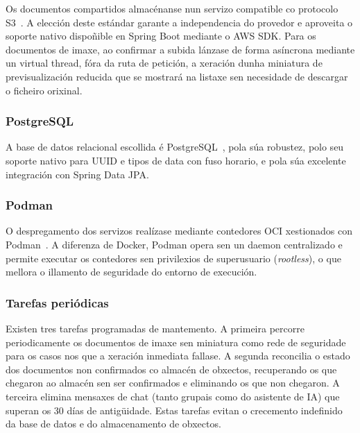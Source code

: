 Os documentos compartidos almacénanse nun servizo compatible co protocolo S3~\cite{minio}. A
elección deste estándar garante a independencia do provedor e aproveita o soporte
nativo dispoñible en Spring Boot mediante o AWS SDK. Para os documentos de imaxe,
ao confirmar a subida lánzase de forma asíncrona mediante un virtual thread,
fóra da ruta de petición, a xeración dunha miniatura de previsualización reducida
que se mostrará na listaxe sen necesidade de descargar o ficheiro orixinal.

\subsubsection*{PostgreSQL}

A base de datos relacional escollida é PostgreSQL~\cite{postgresql}, pola súa robustez, polo seu soporte
nativo para UUID e tipos de data con fuso horario, e pola súa excelente integración
con Spring Data JPA.

\subsubsection*{Podman}

O despregamento dos servizos realízase mediante contedores OCI xestionados con Podman~\cite{podman}.
A diferenza de Docker, Podman opera sen un daemon centralizado e permite executar os
contedores sen privilexios de superusuario (\textit{rootless}), o que mellora o
illamento de seguridade do entorno de execución.

\subsubsection*{Tarefas periódicas}

Existen tres tarefas programadas de mantemento. A primeira percorre periodicamente os
documentos de imaxe sen miniatura como rede de seguridade para os casos nos que a
xeración inmediata fallase. A segunda reconcilia o estado dos documentos non confirmados
co almacén de obxectos, recuperando os que chegaron ao almacén sen ser confirmados e
eliminando os que non chegaron. A terceira elimina mensaxes de chat (tanto grupais como
do asistente de IA) que superan os 30 días de antigüidade. Estas tarefas evitan o
crecemento indefinido da base de datos e do almacenamento de obxectos.
